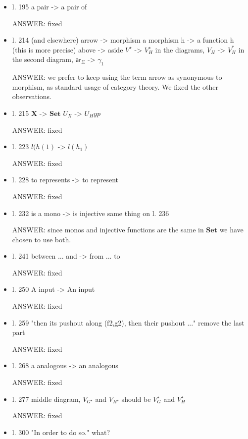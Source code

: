 \documentclass[english,11pt,a4paper]{article}
\begin{document}
\begin{itemize}
\item l. 195 a pair -> a pair of

ANSWER: fixed

\item l. 214 (and elsewhere) arrow -> morphism
a morphism h -> a function h (this is more precise)
above -> aside
$V^\star$ -> $V^\star_H$
in the diagrams, $V_H$ -> $V^*_H$
in the second diagram, $\mathsf{ar}_\Sigma$ -> $\gamma_1$

ANSWER: we prefer to keep using the term arrow as synonymous to morphism, as standard usage of category theory. We fixed the other observations.

\item  l. 215 $\mathbf{X}$ -> $\mathbf{Set}$
$U_X$ -> $U_Hyp$

ANSWER: fixed


\item l. 223 $l(h(1)$ -> $l(h_1)$

ANSWER: fixed

\item l. 228 to represents -> to represent

ANSWER: fixed

\item l. 232 is a mono -> is injective
same thing on l. 236

ANSWER: since monos and injective functions are the same in $\mathbf{Set}$ we have chosen to use both.

\item l. 241 between ... and -> from ... to

ANSWER: fixed

\item l. 250 A input -> An input

ANSWER: fixed

\item l. 259 "then its pushout along (f2,g2), then their pushout ..." remove
the last part

ANSWER: fixed


\item l. 268 a analogous -> an analogous

ANSWER: fixed

\item 
l. 277 middle diagram, $V_{G^\star}$ and $V_{H^\star}$ should be $V^\star_G$ and $V^\star_H$

ANSWER: fixed

\item l. 300 "In order to do so." what?


\end{itemize}
\end{document}
